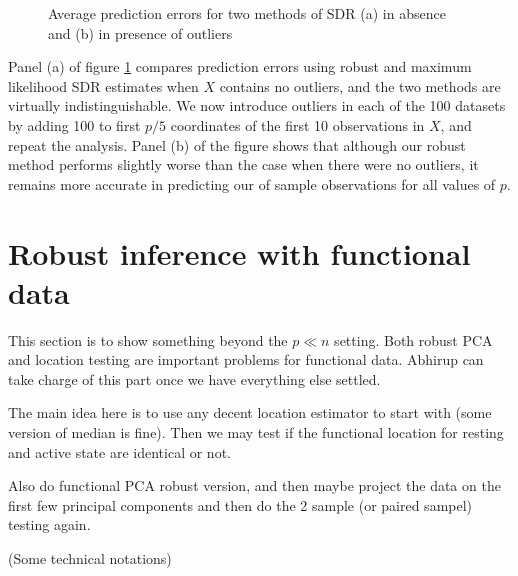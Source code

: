 \documentclass[12pt,letterpaper]{article}
\theoremstyle{definition} \newtheorem{Definition}[Theorem]{Definition}
\begin{document}
\begin{figure}[t]
\begin{center}
\caption{Average prediction errors for two methods of SDR (a) in absence and (b) in presence of outliers}
\label{fig:SDRfig}
\end{center}
\end{figure}

Panel (a) of figure \ref{fig:SDRfig} compares prediction errors using robust and maximum likelihood SDR estimates when $X$ contains no outliers, and the two methods are virtually indistinguishable. We now introduce outliers in each of the 100 datasets by adding 100 to first $p/5$ coordinates of the first 10 observations in $X$, and repeat the analysis. Panel (b) of the figure shows that although our robust method performs slightly worse than the case when there were no outliers, it remains more accurate in predicting our of sample observations for all values of $p$. 

\section{Robust inference with functional data}

This section is to show something beyond the $p \ll n$ setting. Both robust PCA 
and location testing are important problems for functional data. Abhirup can 
take charge of this part once we have everything else settled. 

The main idea here is to use any decent location estimator to start with (some 
version of median is fine). Then we may test if the functional location for resting 
and active state are identical or not. 

Also do functional PCA robust version, and then maybe project the data on the first few
principal components and then do the 2 sample (or paired sampel) testing again.

(Some technical notations)
\end{document}
